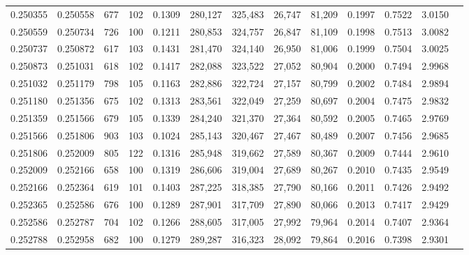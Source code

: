\begin{tabular}{rrrrrrrrrrrrr}
0.250355 & 0.250558 &   677 & 102 &                                     0.1309 & 280,127 & 325,483 &  26,747 &  81,209 & 0.1997 & 0.7522 & 3.0150 \\
0.250559 & 0.250734 &   726 & 100 &                                     0.1211 & 280,853 & 324,757 &  26,847 &  81,109 & 0.1998 & 0.7513 & 3.0082 \\
0.250737 & 0.250872 &   617 & 103 &                                     0.1431 & 281,470 & 324,140 &  26,950 &  81,006 & 0.1999 & 0.7504 & 3.0025 \\
0.250873 & 0.251031 &   618 & 102 &                                     0.1417 & 282,088 & 323,522 &  27,052 &  80,904 & 0.2000 & 0.7494 & 2.9968 \\
0.251032 & 0.251179 &   798 & 105 &                                     0.1163 & 282,886 & 322,724 &  27,157 &  80,799 & 0.2002 & 0.7484 & 2.9894 \\
0.251180 & 0.251356 &   675 & 102 &                                     0.1313 & 283,561 & 322,049 &  27,259 &  80,697 & 0.2004 & 0.7475 & 2.9832 \\
0.251359 & 0.251566 &   679 & 105 &                                     0.1339 & 284,240 & 321,370 &  27,364 &  80,592 & 0.2005 & 0.7465 & 2.9769 \\
0.251566 & 0.251806 &   903 & 103 &                                     0.1024 & 285,143 & 320,467 &  27,467 &  80,489 & 0.2007 & 0.7456 & 2.9685 \\
0.251806 & 0.252009 &   805 & 122 &                                     0.1316 & 285,948 & 319,662 &  27,589 &  80,367 & 0.2009 & 0.7444 & 2.9610 \\
0.252009 & 0.252166 &   658 & 100 &                                     0.1319 & 286,606 & 319,004 &  27,689 &  80,267 & 0.2010 & 0.7435 & 2.9549 \\
0.252166 & 0.252364 &   619 & 101 &                                     0.1403 & 287,225 & 318,385 &  27,790 &  80,166 & 0.2011 & 0.7426 & 2.9492 \\
0.252365 & 0.252586 &   676 & 100 &                                     0.1289 & 287,901 & 317,709 &  27,890 &  80,066 & 0.2013 & 0.7417 & 2.9429 \\
0.252586 & 0.252787 &   704 & 102 &                                     0.1266 & 288,605 & 317,005 &  27,992 &  79,964 & 0.2014 & 0.7407 & 2.9364 \\
0.252788 & 0.252958 &   682 & 100 &                                     0.1279 & 289,287 & 316,323 &  28,092 &  79,864 & 0.2016 & 0.7398 & 2.9301 \\

\end{tabular}
